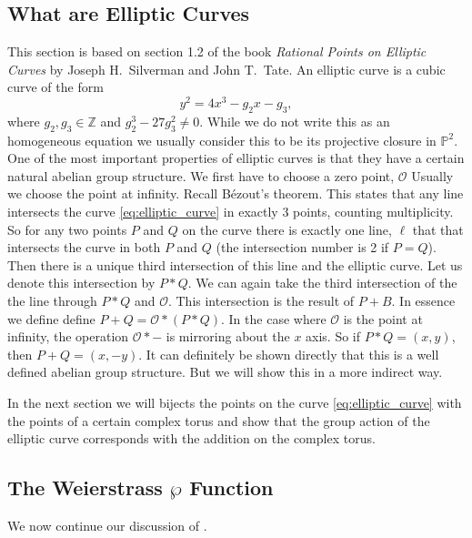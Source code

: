\documentclass[a4paper]{article}
\theoremstyle{theoremdd}
\theoremstyle{definitiondd}
\theoremstyle{remarkdd}
\newcommand{\Z}{\mathbb{Z}}
\begin{document}
\subsection{What are Elliptic Curves}
This section is based on section 1.2 of the book \emph{Rational Points on Elliptic Curves} by Joseph H.\ Silverman and John T.\ Tate\cite{silvermanRationalPointsElliptic2015}.
An elliptic curve is a cubic curve of the form \begin{equation}\label{eq:elliptic_curve}
y^2 = 4x^3 - g_2x - g_3
,\end{equation}
where $g_2, g_3 \in \Z$ and $g_2^3 - 27 g_3^2 \ne 0$. 
While we do not write this as an homogeneous equation we usually consider this to be its projective closure in $\mathbb{P}^2$. 
One of the most important properties of elliptic curves is that they have a certain natural abelian group structure. 
We first have to choose a zero point, $\mathcal{O} $ Usually we choose the point at infinity.
Recall B\'ezout's theorem. 
This states that any line intersects the curve \eqref{eq:elliptic_curve} in exactly 3 points, counting multiplicity.  
So for any two points $P$ and $Q$ on the curve there is exactly one line, $\ell$ that that intersects the curve in both $P$ and $Q$ (the intersection number is 2  if $P = Q$). 
Then there is a unique third intersection of this line and the elliptic curve. Let us denote this intersection by $P*Q$.
We can again take the third intersection of the the line through $P*Q$ and $\mathcal{O}$. This intersection is the result of $P + B$.
In essence we define define $P + Q =\mathcal{O} *(P*Q)$.
In the case where $\mathcal{O} $ is the point at infinity, the operation $\mathcal{O} * -$ is mirroring about the $x$ axis. So if $P * Q = (x,y)$, then $P + Q = (x, -y)$.
It can definitely be shown directly that this is a well defined abelian group structure. But we will show this in a more indirect way. 

In the next section we will bijects the points on the curve \eqref{eq:elliptic_curve} with the points of a certain complex torus and show that the group action of the elliptic curve corresponds with the addition on the complex torus.

\subsection{The Weierstrass $\wp$ Function} \label{sec:The_Weierstrass_wp_Function}
We now continue our discussion of \cite{diamondFirstCourseModular2005a}.
\end{document}
